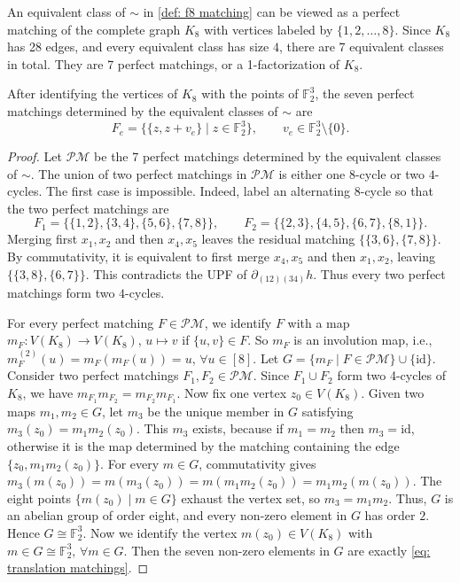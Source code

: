 An equivalent class of $\sim$ in \cref{def: f8 matching} can be viewed as a perfect matching of the complete graph $K_8$ with vertices labeled by $\{1,2,\ldots, 8\}.$
Since $K_8$ has 28 edges, and every equivalent class has size $4$, there are 7 equivalent classes in total.
They are 7 perfect matchings, or a 1-factorization of $K_8$.

\begin{lemma}
\label{lm: f8 one factorization}
After identifying the vertices of $K_8$ with the points of
$\mathbb F_2^3$, the seven perfect matchings determined by the equivalent classes of $\sim$ are
\begin{equation}
    F_e=\bigl\{\{z,z+v_e\}\mid z\in\mathbb F_2^3\bigr\}, \qquad v_e\in\mathbb F_2^3\setminus\{0\}.
 \label{eq: translation matchings}
\end{equation}
\end{lemma}

\begin{proof}
Let $\mathcal{PM}$ be the 7 perfect matchings determined by the equivalent classes of $\sim$.
The union of two perfect matchings in $\mathcal{PM}$ is either one $8$-cycle or two $4$-cycles.  
The first case is impossible.  Indeed, label an alternating $8$-cycle so that the two perfect matchings are
\[
 F_1=\{\{1,2\},\{3,4\},\{5,6\},\{7,8\}\},\qquad
 F_2=\{\{2,3\},\{4,5\},\{6,7\},\{8,1\}\}.
\]
Merging first $x_1,x_2$ and then $x_4,x_5$ leaves the residual matching
$\{\{3,6\},\{7,8\}\}$.
By commutativity, it is equivalent to first merge $x_4,x_5$ and then $x_1,x_2$, leaving $\{\{3,8\}, \{6,7\}\}$.  
This contradicts the UPF of $\partial_{(12)(34)}h$.
Thus every two perfect matchings form two $4$-cycles.


For every perfect matching $F\in\mathcal{PM}$, we identify $F$ with a map $m_F:V(K_8)\to V(K_8)$, $u\mapsto v$ if $\{u,v\}\in F.$
So $m_F$ is an involution map, i.e., $m_F^{(2)}(u)=m_F(m_F(u))=u,\,\forall u\in [8].$
Let $G=\{m_F\mid F\in \mathcal{PM}\}\cup \{\mathrm{id}\}$.
Consider two perfect matchings $F_1,F_2\in \mathcal{PM}$.
Since $F_1\cup F_2$ form two 4-cycles of $K_8$, we have $m_{F_1}m_{F_2}=m_{F_2}m_{F_1}$.
Now fix one vertex $z_0\in V(K_8)$.
Given two maps $m_1,m_2\in G$, let $m_3$ be the unique member in $G$ satisfying $m_3(z_0)=m_1m_2(z_0)$.
This $m_3$ exists, because if $m_1=m_2$ then $m_3=\mathrm{id}$, otherwise it is the map determined by the matching containing the edge $\{z_0,m_1m_2(z_0)\}.$
For every $m\in G$, commutativity gives $m_3(m(z_0))=m(m_3(z_0))=m(m_1m_2(z_0))=m_1m_2(m(z_0))$.  
The eight points $\{m(z_0)\mid m\in G\}$ exhaust the vertex set, so $m_3=m_1m_2$.  
Thus, $G$ is an abelian group of
order eight, and every non-zero element in $G$ has order $2$.
Hence $G\cong \mathbb F_2^3$. 
Now we identify the vertex $m(z_0)\in V(K_8)$ with $m\in G\cong \mathbb F_2^3,\,\forall m\in G.$
Then the seven non-zero elements in $G$ are exactly \eqref{eq: translation matchings}.
\end{proof}

